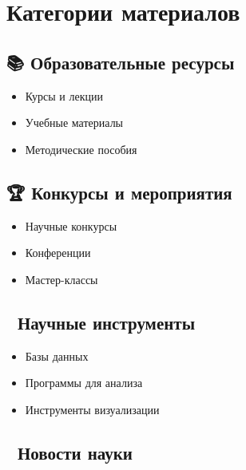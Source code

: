 \documentclass[
  russian,
  12pt,
  a4paper,
]{article}
\providecommand{\tightlist}{%
  \setlength{\itemsep}{0pt}\setlength{\parskip}{0pt}}
\begin{document}
\section{Категории
материалов}\label{ux43aux430ux442ux435ux433ux43eux440ux438ux438-ux43cux430ux442ux435ux440ux438ux430ux43bux43eux432}

\subsection{📚 Образовательные
ресурсы}\label{ux43eux431ux440ux430ux437ux43eux432ux430ux442ux435ux43bux44cux43dux44bux435-ux440ux435ux441ux443ux440ux441ux44b}

\begin{itemize}
\tightlist
\item
  Курсы и лекции
\item
  Учебные материалы
\item
  Методические пособия
\end{itemize}

\subsection{🏆 Конкурсы и
мероприятия}\label{ux43aux43eux43dux43aux443ux440ux441ux44b-ux438-ux43cux435ux440ux43eux43fux440ux438ux44fux442ux438ux44f-1}

\begin{itemize}
\tightlist
\item
  Научные конкурсы
\item
  Конференции
\item
  Мастер-классы
\end{itemize}

\subsection{🔬 Научные
инструменты}\label{ux43dux430ux443ux447ux43dux44bux435-ux438ux43dux441ux442ux440ux443ux43cux435ux43dux442ux44b}

\begin{itemize}
\tightlist
\item
  Базы данных
\item
  Программы для анализа
\item
  Инструменты визуализации
\end{itemize}

\subsection{📰 Новости
науки}\label{ux43dux43eux432ux43eux441ux442ux438-ux43dux430ux443ux43aux438}
\end{document}
